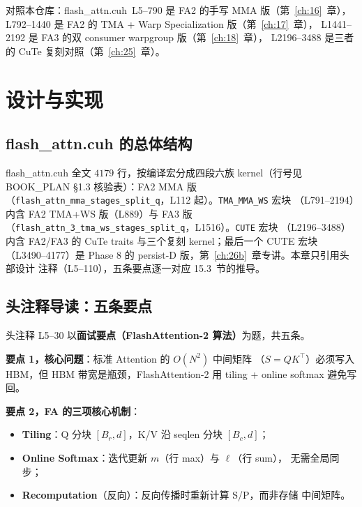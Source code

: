 对照本仓库：flash\_attn.cuh~L5--790 是 FA2 的手写 MMA 版（第~\ref{ch:16}~章），
L792--1440 是 FA2 的 TMA + Warp Specialization 版（第~\ref{ch:17}~章），
L1441--2192 是 FA3 的双 consumer warpgroup 版（第~\ref{ch:18}~章），
L2196--3488 是三者的 CuTe 复刻对照（第~\ref{ch:25}~章）。

\section{设计与实现}

\subsection{flash\_attn.cuh 的总体结构}

flash\_attn.cuh 全文 $4179$ 行，按编译宏分成四段六族 kernel（行号见
BOOK\_PLAN \S 1.3 核验表）：FA2 MMA 版
（\texttt{flash\_\allowbreak{}attn\_\allowbreak{}mma\_\allowbreak{}stages\_\allowbreak{}split\_\allowbreak{}q}，L112 起）。\texttt{TMA\_MMA\_WS} 宏块
（L791--2194）内含 FA2 TMA+WS 版（L889）与 FA3 版
（\texttt{flash\_\allowbreak{}attn\_\allowbreak{}3\_\allowbreak{}tma\_\allowbreak{}ws\_\allowbreak{}stages\_\allowbreak{}split\_\allowbreak{}q}，L1516）。\texttt{CUTE} 宏块
（L2196--3488）内含 FA2/FA3 的 CuTe traits 与三个复刻 kernel；最后一个 CUTE
宏块（L3490--4177）是 Phase 8 的 persist-D 版，第~\ref{ch:26b}~章专讲。本章只引用头部设计
注释（L5--110），五条要点逐一对应 15.3~节的推导。

\subsection{头注释导读：五条要点}

头注释 L5--30 以\textbf{面试要点（FlashAttention-2 算法）}为题，共五条。

\textbf{要点 1，核心问题}：标准 Attention 的 $O(N^{2})$ 中间矩阵
（$S = QK^{\top}$）必须写入 HBM，但 HBM 带宽是瓶颈，FlashAttention-2 用
tiling + online softmax 避免写回。

\textbf{要点 2，FA 的三项核心机制}：
\begin{itemize}
  \item \textbf{Tiling}：Q 分块 $[B_r, d]$，K/V 沿 seqlen 分块 $[B_c, d]$；
  \item \textbf{Online Softmax}：迭代更新 $m$（行 max）与 $\ell$（行 sum），
        无需全局同步；
  \item \textbf{Recomputation}（反向）：反向传播时重新计算 S/P，而非存储
        中间矩阵。
\end{itemize}

